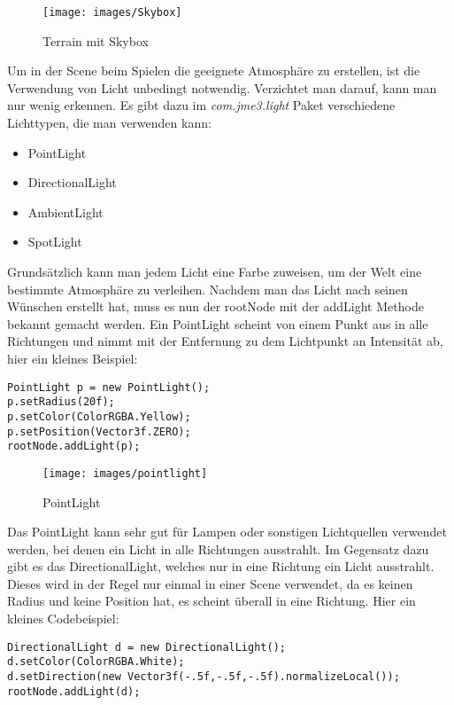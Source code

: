 \begin{figure}[h!]
		
		\centering\texttt{[image: images/Skybox]}
		\caption{Terrain mit Skybox} 
		
\end{figure} 
\newpage



Um in der Scene beim Spielen die geeignete Atmosphäre zu erstellen, ist die Verwendung von Licht unbedingt notwendig. Verzichtet man darauf, kann man nur wenig erkennen. Es gibt dazu im \emph{com.jme3.light} Paket verschiedene Lichttypen, die man verwenden kann:
\begin{itemize}
	\item PointLight
	\item DirectionalLight
	\item AmbientLight
	\item SpotLight
\end{itemize}
Grundsätzlich kann man jedem Licht eine Farbe zuweisen, um der Welt eine bestimmte Atmosphäre zu verleihen. Nachdem man das Licht nach seinen Wünschen erstellt hat, muss es nun der rootNode mit der addLight Methode bekannt gemacht werden. Ein PointLight scheint von einem Punkt aus in alle Richtungen und nimmt mit der Entfernung zu dem Lichtpunkt an Intensität ab, hier ein kleines Beispiel:
\begin{lstlisting}
PointLight p = new PointLight();
p.setRadius(20f);
p.setColor(ColorRGBA.Yellow);
p.setPosition(Vector3f.ZERO);
rootNode.addLight(p);
\end{lstlisting}

\begin{figure}[h!]
	
	
	
	\centering\texttt{[image: images/pointlight]} 
	\caption{PointLight}
	
\end{figure}
Das PointLight kann sehr gut für Lampen oder sonstigen Lichtquellen verwendet werden, bei denen ein Licht in alle Richtungen ausstrahlt. Im Gegensatz dazu gibt es das DirectionalLight, welches nur in eine Richtung ein Licht ausstrahlt. Dieses wird in der Regel nur einmal in einer Scene verwendet, da es keinen Radius und keine Position hat, es scheint überall in eine Richtung. Hier ein kleines Codebeispiel:
\begin{lstlisting}
DirectionalLight d = new DirectionalLight();
d.setColor(ColorRGBA.White);
d.setDirection(new Vector3f(-.5f,-.5f,-.5f).normalizeLocal());
rootNode.addLight(d);
\end{lstlisting}

